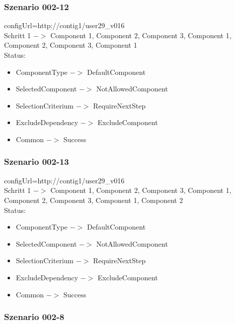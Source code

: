 \documentclass{article}
\begin{document}
\subsubsection{Szenario 002-12}

configUrl=http://contig1/user29\_v016\\

\noindent Schritt 1 $->$ Component 1, Component 2, Component 3, Component 1,
Component 2, Component 3, Component 1\\

\noindent Status:

\begin{itemize}
  \item ComponentType $->$ DefaultComponent
  \item SelectedComponent $->$ NotAllowedComponent
  \item SelectionCriterium $->$ RequireNextStep
  \item ExcludeDependency $->$ ExcludeComponent
  \item Common $->$ Success
\end{itemize}

\subsubsection{Szenario 002-13}

configUrl=http://contig1/user29\_v016\\

\noindent Schritt 1 $->$ Component 1, Component 2, Component 3, Component 1,
Component 2, Component 3, Component 1, Component 2\\

\noindent Status:

\begin{itemize}
  \item ComponentType $->$ DefaultComponent
  \item SelectedComponent $->$ NotAllowedComponent
  \item SelectionCriterium $->$ RequireNextStep
  \item ExcludeDependency $->$ ExcludeComponent
  \item Common $->$ Success
\end{itemize}

\subsubsection{Szenario 002-8}
\end{document}

